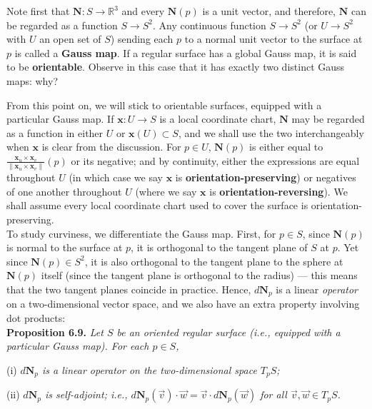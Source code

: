 \documentclass[leqno]{book}
\begin{document}
Note first that $\mathbf N:S\to\mathbb R^3$ and every $\mathbf N(p)$ is a unit vector, and therefore, $\mathbf N$ can be regarded as a function $S\to S^2$.  Any continuous function $S\to S^2$ (or $U\to S^2$ with $U$ an open set of $S$) sending each $p$ to a normal unit vector to the surface at $p$ is called a \textbf{Gauss map}.  If a regular surface has a global Gauss map, it is said to be \textbf{orientable}.  Observe in this case that it has exactly two distinct Gauss maps: why?

From this point on, we will stick to orientable surfaces, equipped with a particular Gauss map.  If $\mathbf x:U\to S$ is a local coordinate chart, $\mathbf N$ may be regarded as a function in either $U$ or $\mathbf x(U)\subset S$, and we shall use the two interchangeably when $\mathbf x$ is clear from the discussion.  For $p\in U$, $\mathbf N(p)$ is either equal to $\frac{\mathbf x_u\times\mathbf x_v}{\|\mathbf x_u\times\mathbf x_v\|}(p)$ or its negative; and by continuity, either the expressions are equal throughout $U$ (in which case we say $\mathbf x$ is \textbf{orientation-preserving}) or negatives of one another throughout $U$ (where we say $\mathbf x$ is \textbf{orientation-reversing}).
We shall assume every local coordinate chart used to cover the surface is orientation-preserving.\\

\noindent To study curviness, we differentiate the Gauss map.  First, for $p\in S$, since $\mathbf N(p)$ is normal to the surface at $p$, it is orthogonal to the tangent plane of $S$ at $p$.  Yet since $\mathbf N(p)\in S^2$, it is also orthogonal to the tangent plane to the sphere at $\mathbf N(p)$ itself (since the tangent plane is orthogonal to the radius) \---- this means that the two tangent planes coincide in practice.  Hence, $d\mathbf N_p$ is a linear \emph{operator} on a two-dimensional vector space, and we also have an extra property involving dot products:\\

\noindent\textbf{Proposition 6.9.} \emph{Let $S$ be an oriented regular surface (i.e., equipped with a particular Gauss map).  For each $p\in S$,}

(i) \emph{$d\mathbf N_p$ is a linear operator on the two-dimensional space $T_pS$;}

(ii) \emph{$d\mathbf N_p$ is self-adjoint; i.e., $d\mathbf N_p(\vec v)\cdot\vec w=\vec v\cdot d\mathbf N_p(\vec w)$ for all $\vec v,\vec w\in T_pS$.}\\
\end{document}
